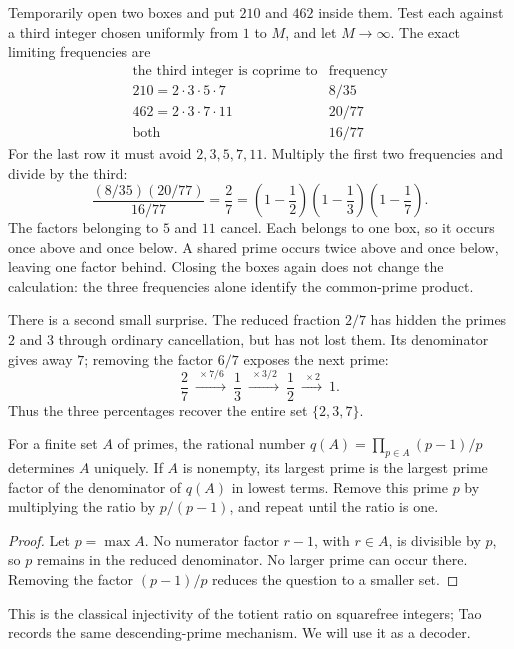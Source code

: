 Temporarily open two boxes and put $210$ and $462$ inside them. Test each
against a third integer chosen uniformly from $1$ to $M$, and let
$M\to\infty$. The exact limiting frequencies are
\[
\begin{array}{c|c}
 \text{the third integer is coprime to} & \text{frequency}\\ \hline
 210=2\cdot3\cdot5\cdot7 & 8/35\\[2pt]
 462=2\cdot3\cdot7\cdot11 & 20/77\\[2pt]
 \text{both} & 16/77
\end{array}
\]
For the last row it must avoid $2,3,5,7,11$. Multiply the first two
frequencies and divide by the third:
\[
 \frac{(8/35)(20/77)}{16/77}
 =\frac27
 =\left(1-\frac12\right)
  \left(1-\frac13\right)
  \left(1-\frac17\right).
\]
The factors belonging to $5$ and $11$ cancel. Each belongs to one box,
so it occurs once above and once below. A shared prime occurs twice
above and once below, leaving one factor behind. Closing the boxes
again does not change the calculation: the three frequencies alone
identify the common-prime product.

There is a second small surprise. The reduced fraction $2/7$ has hidden
the primes $2$ and $3$ through ordinary cancellation, but has not lost
them. Its denominator gives away $7$; removing the factor $6/7$ exposes
the next prime:
\[
 \frac27\ \xrightarrow{\ \times7/6\ }\ \frac13
 \ \xrightarrow{\ \times3/2\ }\ \frac12
 \ \xrightarrow{\ \times2\ }\ 1.
\]
Thus the three percentages recover the entire set $\{2,3,7\}$.

\begin{lemma}
\label{rec:totient-decoder}
For a finite set $A$ of primes, the rational number
$q(A)=\prod_{p\in A}(p-1)/p$ determines $A$ uniquely. If $A$ is nonempty,
its largest prime is the largest prime factor of the denominator of
$q(A)$ in lowest terms. Remove this prime $p$ by multiplying the ratio
by $p/(p-1)$, and repeat until the ratio is one.
\end{lemma}
\begin{proof}
Let $p=\max A$. No numerator factor $r-1$, with $r\in A$, is divisible
by $p$, so $p$ remains in the reduced denominator. No larger prime
can occur there. Removing the factor $(p-1)/p$ reduces the question
to a smaller set.
\end{proof}
This is the classical injectivity of the totient ratio on squarefree
integers; Tao~\cite[Lemma~2.1 and Remark~2.3]{RecTaoTotient2024} records
the same descending-prime mechanism. We will use it as a decoder.


